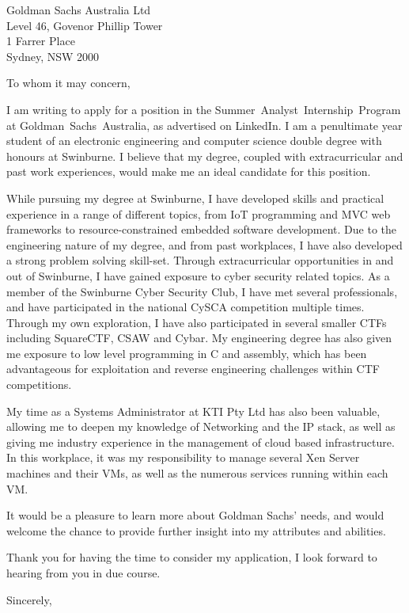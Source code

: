 \documentclass[
    backaddress=false,
    foldmarks=false,
    fromalign=right,
    fromrule,
    fromphone,
    fromemail,
    parskip=half,
    refline=nodate
]{scrlttr2}
\begin{document}
    


    \renewcommand*\raggedsignature{\raggedright}


    \begin{letter}{%
        Goldman Sachs Australia Ltd \\
        Level 46, Govenor Phillip Tower \\
        1 Farrer Place \\
        Sydney, NSW 2000}
        \opening{To whom it may concern,}
        \raggedbottom
        I am writing to apply for a position in the Summer~Analyst~Internship~Program at Goldman~Sachs~Australia, as advertised on LinkedIn. I am a penultimate year student of an electronic engineering and computer science double degree with honours at Swinburne. I believe that my degree, coupled with extracurricular and past work experiences, would make me an ideal candidate for this position.

        While pursuing my degree at Swinburne, I have developed skills and practical experience in a range of different topics, from IoT programming and MVC web frameworks to resource-constrained embedded software development. Due to the engineering nature of my degree, and from past workplaces, I have also developed a strong problem solving skill-set. Through extracurricular opportunities in and out of Swinburne, I have gained exposure to cyber security related topics. As a member of the Swinburne Cyber Security Club, I have met several professionals, and have participated in the national CySCA competition multiple times. Through my own exploration, I have also participated in several smaller CTFs including SquareCTF, CSAW and Cybar. My engineering degree has also given me exposure to low level programming in C and assembly, which has been advantageous for exploitation and reverse engineering challenges within CTF competitions.

        My time as a Systems Administrator at KTI Pty Ltd has also been valuable, allowing me to deepen my knowledge of Networking and the IP stack, as well as giving me industry experience in the management of cloud based infrastructure. In this workplace, it was my responsibility to manage several Xen Server machines and their VMs, as well as the numerous services running within each VM.

        It would be a pleasure to learn more about Goldman Sachs' needs, and would welcome the chance to provide further insight into my attributes and abilities.

        Thank you for having the time to consider my application, I look forward to hearing from you in due course.
        \closing{Sincerely,}
    \end{letter}
\end{document}

